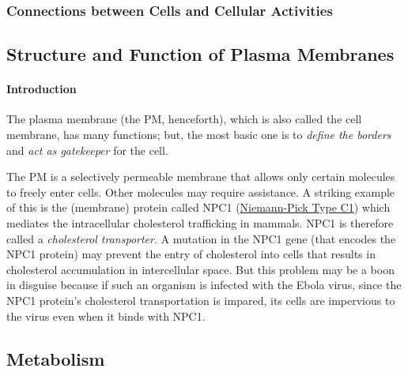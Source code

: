 \documentclass[12pt]{article}
\begin{document}
\subsubsection{Connections between Cells and Cellular Activities}


\subsection{Structure and Function of Plasma Membranes}
\paragraph{Introduction}
The plasma membrane (the PM, henceforth), which is also called the cell membrane, has many functions; but, the most basic one is to \emph{define the borders} and \emph{act as gatekeeper} for the cell.

The PM is a selectively permeable membrane that allows only certain molecules to freely enter cells. Other molecules may require assistance. A striking example of this is the (membrane) protein called NPC1 (\href{https://en.wikipedia.org/wiki/NPC1}{Niemann-Pick Type C1}) which mediates the intracellular cholesterol trafficking in mammals. NPC1 is therefore called a \emph{cholesterol transporter}. A mutation in the NPC1 gene (that encodes the NPC1 protein) may prevent the entry of cholesterol into cells that results in cholesterol accumulation in intercellular space. But this problem may be a boon in disguise because if such an organism is infected with the Ebola virus, since the NPC1 protein's cholesterol transportation is impared, its cells are impervious to the virus even when it binds with NPC1.

\subsection{Metabolism}
\end{document}
